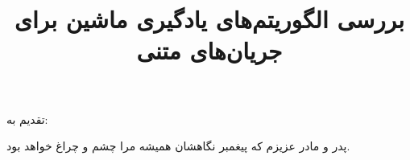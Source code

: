 \subject{مهندسی کامپیوتر}
\title{بررسی الگوریتم‌های یادگیری ماشین برای جریان‌های متنی}


\firstPage
\besmPage


 \newpage
\thispagestyle{empty}

{\Large تقدیم به:}\\
\begin{flushleft}
{\huge
\vspace{7mm}
پدر و مادر عزیزم که پیغمبر نگاهشان همیشه مرا چشم و چراغ خواهد بود.}
\end{flushleft}


